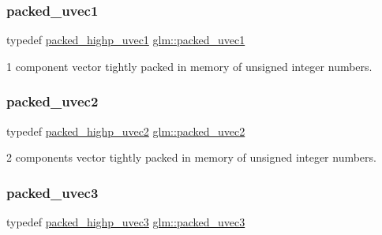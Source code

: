 \subsubsection{\texorpdfstring{packed\+\_\+uvec1}{packed\_uvec1}}
{\footnotesize\ttfamily typedef \mbox{\hyperlink{group__gtc__type__aligned_ga160352f526bef94d143ccb525095936e}{packed\+\_\+highp\+\_\+uvec1}} \mbox{\hyperlink{group__gtc__type__aligned_gab4eb372e84e817a0d29128128394df01}{glm\+::packed\+\_\+uvec1}}}



1 component vector tightly packed in memory of unsigned integer numbers. 

\mbox{\label{group__gtc__type__aligned_gac05992fb0ced52150634ce1d8f95a8ad}} 
\subsubsection{\texorpdfstring{packed\+\_\+uvec2}{packed\_uvec2}}
{\footnotesize\ttfamily typedef \mbox{\hyperlink{group__gtc__type__aligned_gafd17d664314ead069de290b1d5137c47}{packed\+\_\+highp\+\_\+uvec2}} \mbox{\hyperlink{group__gtc__type__aligned_gac05992fb0ced52150634ce1d8f95a8ad}{glm\+::packed\+\_\+uvec2}}}



2 components vector tightly packed in memory of unsigned integer numbers. 

\mbox{\label{group__gtc__type__aligned_ga4433b8f226dc66e91e99cb8079ddc7e3}} 
\subsubsection{\texorpdfstring{packed\+\_\+uvec3}{packed\_uvec3}}
{\footnotesize\ttfamily typedef \mbox{\hyperlink{group__gtc__type__aligned_ga607425d3ca2ad292b115d09aef19e372}{packed\+\_\+highp\+\_\+uvec3}} \mbox{\hyperlink{group__gtc__type__aligned_ga4433b8f226dc66e91e99cb8079ddc7e3}{glm\+::packed\+\_\+uvec3}}}



